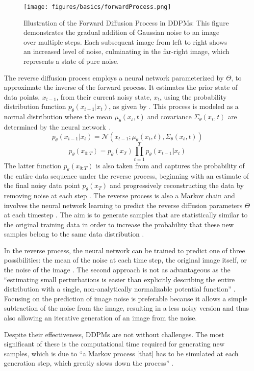 \begin{figure}[ht]
\centering
  \texttt{[image: figures/basics/forwardProcess.png]}
  \caption{Illustration of the Forward Diffusion Process in DDPMs: This figure demonstrates the gradual addition of Gaussian noise to an image over multiple steps. Each subsequent image from left to right shows an increased level of noise, culminating in the far-right image, which represents a state of pure noise.}\label{fig:figureForwardProcess}
\end{figure}

The reverse diffusion process employs a neural network parameterized by \(\Theta\), to approximate the inverse of the forward process. It estimates the prior state of data points, \( x_{t-1} \), from their current noisy state, \( x_t \), using the probability distribution function \( p_\theta(x_{t-1} | x_t) \), as given by \citeauthor{martinez2023understanding}. This process is modeled as a normal distribution where the mean \( \mu_\theta(x_t, t) \) and covariance \( \Sigma_\theta(x_t, t) \) are determined by the neural network \citep{yangdiffusionSummary}.\[
  p_\theta(x_{t-1} | x_t) = \mathcal{N}(x_{t-1}; \mu_\theta(x_t, t), \Sigma_\theta(x_t, t))
\] \[p_\theta(x_{0:T}) = p_\theta(x_{T}) \prod_{t=1}^T p_\theta(x_{t-1} | x_t) \] The latter function \(p_\theta(x_{0:T})\) is also taken from \citeauthor{martinez2023understanding} and captures the probability of the entire data sequence under the reverse process, beginning with an estimate of the final noisy data point \(p_\theta(x_{T})\) and progressively reconstructing the data by removing noise at each step \citep{hoDDPMs,martinez2023understanding}. The reverse process is also a Markov chain and involves the neural network learning to predict the reverse diffusion parameters \(\Theta\) at each timestep \citep{yangdiffusionSummary}. The aim is to generate samples that are statistically similar to the original training data in order to increase the probability that these new samples belong to the same data distribution \citep{yangdiffusionSummary}.

In the reverse process, the neural network can be trained to predict one of three possibilities: the mean of the noise at each time step, the original image itself, or the noise of the image \citep{hoDDPMs}. The second approach is not as advantageous as the ``estimating small perturbations is easier than explicitly describing the entire distribution with a single, non-analytically normalizable potential function'' \citep{sohlDDPM}. Focusing on the prediction of image noise is preferable because it allows a simple subtraction of the noise from the image, resulting in a less noisy version and thus also allowing an iterative generation of an image from the noise.

Despite their effectiveness, DDPMs are not without challenges. The most significant of these is the computational time required for generating new samples, which is due to ``a Markov process [that] has to be simulated at each generation step, which greatly slows down the process'' \citep{martinez2023understanding}.